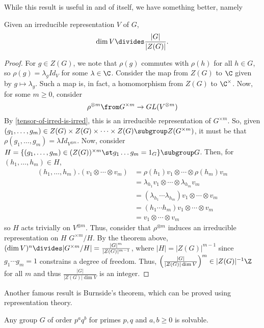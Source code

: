 \documentclass[11pt,leqno,oneside]{amsbook}
\numberwithin{thm}{section}
\begin{document}
While this result is useful in and of itself, we have something
better, namely 
\begin{thm}
  Given an irreducible representation \(V\) of \(G\), \[
    \dim V  \divides \frac{|G|}{|Z(G)|}.
  \]
\end{thm}
\begin{proof}
  For \(g \in Z(G)\), we note that \(\rho(g)\) commutes with
  \(\rho(h)\) for all \(h \in G\), so \(\rho(g) = \lambda_g Id_V\) for
  some \(\lambda \in \C\). Consider the map from \(Z(G)\) to \(\C\)
  given by \(g \mapsto \lambda_g\). Such a map is, in fact, a
  homomorphism from \(Z(G)\) to \(\C^\times\). Now, for some \(m \geq
  0\), consider \[
    \rho^{\otimes m} \from G^{\times m} \to GL(V^{\otimes m})
  \]
  By \ref{tensor-of-irred-is-irred}, this is an irreducible representation of \(G^{\times
    m}\). So, given \((g_1, \ldots, g_m) \in Z(G) \times Z(G)
  \times \cdots \times Z(G) \subgroup Z(G^{\times m})\), it must be
  that \(\rho(g_1, \ldots, g_m) = \lambda Id_{V^{\otimes m}}\). Now,
  consider \(H = \{(g_1, \ldots, g_m) \in (Z(G))^{\times m} \st g_1
  \ldots g_m = 1_G\} \subgroup G\). Then, for \((h_1, \ldots, h_m) \in
  H\),
  \begin{align*}
    (h_1, \ldots, h_m).(v_1 \otimes \cdots \otimes v_m)
    & = \rho(h_1)v_1 \otimes \cdots \otimes \rho(h_m)v_m \\
    & = \lambda_{h_1} v_1 \otimes \cdots \otimes \lambda_{h_m} v_m \\
    & = (\lambda_{h_1} \cdots \lambda_{h_m})v_1 \otimes \cdots \otimes
      v_m \\
    & = (h_1 \cdots h_m)v_1 \otimes \cdots \otimes v_m \\
    & = v_1 \otimes \cdots \otimes v_m
  \end{align*}
  so \(H\) acts trivially on \(V^{\otimes m}\). Thus, consider that
  \(\rho^{\otimes m}\) induces an irreducible representation on \(H\)
  \(G^{\times m}/H\). By the theorem above, \((\dim V)^n \divides
  |G^{\times m}/H| = \frac{|G|^m}{|Z(G)|^{m-1}}\), where \(|H| =
  |Z(G)|^{m-1}\) since \(g_1 \cdots g_m = 1\) constrains a degree of
  freedom. Thus, \(\left(\frac{|G|}{|Z(G)| \dim V}\right)^m \in
  |Z(G)|^{-1} \Z\) for all \(m\) and thus \(\frac{|G|}{|Z(G)| \dim
    V}\) is an integer.
\end{proof}
Another famous result is Burnside's theorem, which can be proved using
representation theory.
\begin{thm}
  Any group \(G\) of order \(p^a q^b\) for primes \(p,q\) and \(a,b
  \geq 0\) is solvable.
\end{thm}
\end{document}
